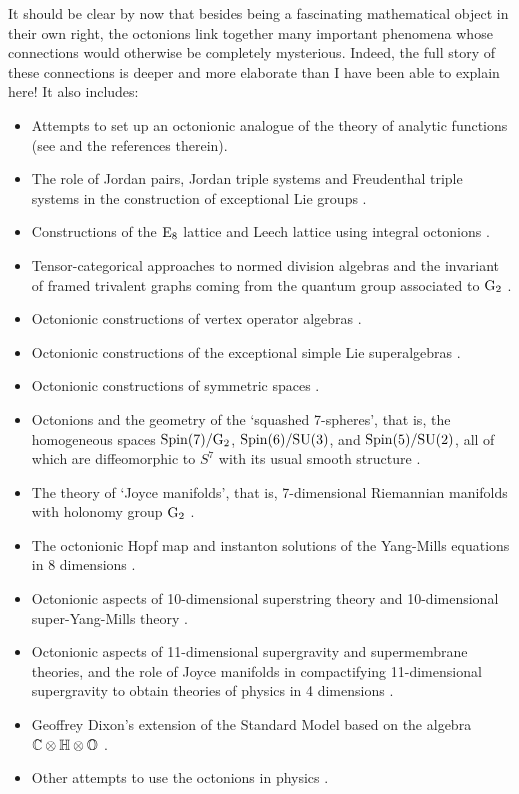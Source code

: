It should be clear by now that besides being a fascinating mathematical
object in their own right, the octonions link together many important
phenomena whose connections would otherwise be completely mysterious.  
Indeed, the full story of these connections is deeper and more elaborate
than I have been able to explain here!   It also includes:
\begin{itemize} 
\item Attempts to set up an octonionic analogue of the theory of 
analytic functions (see \cite{GT} and the references therein). 
\item The role of Jordan pairs, Jordan triple systems and 
Freudenthal triple systems in the construction of exceptional Lie groups 
\cite{Brown,Faulkner,FF,GKN,GT,McCrimmon,Meyberg}.
\item Constructions of the ${\rm E}_8$ lattice and Leech lattice using
integral octonions \cite{Coxeter,EG}.
\item Tensor-categorical approaches to normed division algebras
and the invariant of framed trivalent graphs coming from the
quantum group associated to ${\rm G}_2$ \cite{Boos,Bremner,Kuperberg,Rost}.
\item Octonionic constructions of vertex operator algebras \cite{FFrenkel}. 
\item Octonionic constructions of the exceptional simple Lie superalgebras 
\cite{Sudbery2}. 
\item Octonionic constructions of symmetric spaces \cite{Besse}.
\item Octonions and the geometry of the `squashed 7-spheres', that is, 
the homogeneous spaces ${\rm Spin}(7)/{\rm G}_2$, ${\rm Spin}(6)/{\rm SU}(3)$, and 
${\rm Spin}(5)/{\rm SU}(2)$, all of which are diffeomorphic to $S^7$ with its 
usual smooth structure \cite{CD}. 
\item The theory of `Joyce manifolds', that is, 7-dimensional Riemannian 
manifolds with holonomy group ${\rm G}_2$ \cite{Joyce}. 
\item The octonionic Hopf map and instanton solutions 
of the Yang-Mills equations in 8 dimensions \cite{GKS}. 
\item Octonionic aspects of 10-dimensional superstring theory and 
10-dimensional super-Yang-Mills theory 
\cite{CH,Deligne,Evans,KT,Schray,Sierra}.
\item Octonionic aspects of 11-dimensional supergravity and supermembrane 
theories, and the role of Joyce manifolds in compactifying 11-dimensional 
supergravity to obtain theories of physics in 4 dimensions \cite{Duff}. 
\item Geoffrey Dixon's extension of the Standard Model based on the
algebra ${\mathbb C} \otimes {\mathbb H} \otimes {\mathbb O}$ \cite{Dixon}.  
\item Other attempts to use the octonions in physics 
\cite{CMT,GT,LPS,Okubo}.
\end{itemize}  

